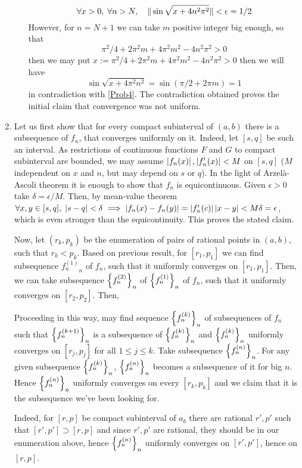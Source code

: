 \documentclass[10pt]{article} %
\begin{document}
\begin{enumerate}[(1)]
\begin{enumerate}[(a)]
\begin{equation}
			\forall x>0,\;\forall n>N,\quad \|\sin\sqrt{x+4n^2\pi^2}\|<\epsilon=1/2\label{Prob4}\end{equation}
			However, for $n=N+1$ we can take $m$ positive integer big enough, so that
			\[\pi^2/4+2\pi^2m+4\pi^2m^2-4n^2\pi^2>0\]
			then we may put $x:=\pi^2/4+2\pi^2m+4\pi^2m^2-4n^2\pi^2>0$
			then we will have
			\[\sin\sqrt{x+4\pi^2n^2}=\sin(\pi/2+2\pi m)=1\]
			in contradiction with \ref{Prob4}. The contradiction obtained proves the initial claim that convergence
			was not uniform.
	\end{enumerate}
\item Let us first show that for every compact subinterval of $(a,b)$ there is a subsequence of $f_n$, that converges
	uniformly on it. Indeed, let $[s,q]$ be such an interval. As restrictions of continuous functions $F$ and $G$ to compact
	subinterval are bounded, we may assume $\left|f_n(x)\right|,\left|f_n'(x)\right|<M$ on $[s,q]$ ($M$ independent on $x$ and $n$,
	but may depend on $s$ or $q$). In the light of Arzel\`a-Ascoli theorem it is enough to show that $f_n$ is equicontinuous.
	Given $\epsilon>0$ take $\delta=\epsilon/M$. Then, by mean-value theorem $\forall x,y\in[s,q],\;\left|s-q\right|<\delta\implies
	\left|f_n(x)-f_n(y)\right|=\left|f_n'(c)\right|\left|x-y\right|<M\delta=\epsilon$, which is even stronger than the equicontinuity. This 
	proves the stated claim.

	Now, let $(r_k,p_k)$ be the enumeration of pairs of rational points in $(a,b)$, such that $r_k<p_k$. Based on previous
	result, for $[r_1,p_1]$ we can find subsequence ${f^{(1)}_n}_n$ of $f_n$, such that it uniformly converges on $[r_1,p_1]$. Then,
	we can take subsequence $\left\{
	f^{(2)}_n\right\}_n$ of $\left\{f^{(1)}_n\right\}_n$ of $f_n$, such that it uniformly converges on $[r_2,p_2]$. Then,
	
	Proceeding in this way, may find sequence $\left\{f^{(k)}_n\right\}_n$ of subsequences of $f_n$ such that $\left\{f^{(k+1)}_n\right\}_n$ 
	is a subsequence of $\left\{f^{(k)}_n\right\}_n$ and $\left\{f^{(k)}_n\right\}_n$ uniformly converges on 
	$[r_j,p_j]$ for all $1\leq j\leq k$. Take subsequence $\left\{f^{(n)}_n\right\}_n$. For any given subsequence 
	$\left\{f^{(k)}_n\right\}_n$, $\left\{f^{(n)}_n\right\}_n$ becomes a subsequence of it for big $n$. Hence
	$\left\{f^{(n)}_n\right\}_n$ uniformly converges on every $[r_k,p_k]$ and we claim that it is the subsequence we've been looking for.

	Indeed, for $[r,p]$ be compact subinterval of $a_b$ there are rational $r', p'$ such that $[r',p']\supset[r,p]$ and
	since $r',p'$ are rational, they should be in our enumeration above, hence 
	$\left\{f^{(n)}_n\right\}_n$ uniformly converges on $[r',p']$, hence on $[r,p]$.
\end{enumerate}
\end{document}
